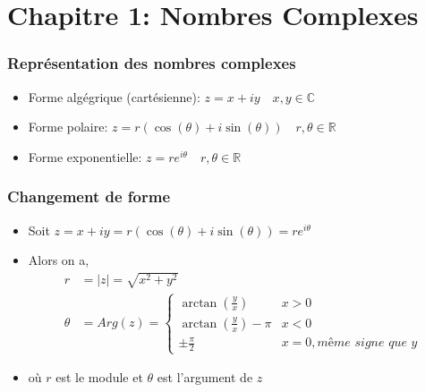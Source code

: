 \section*{Chapitre 1: Nombres Complexes}

\subsubsection*{Représentation des nombres complexes}
\begin{itemize}[itemsep = 0.5em]
    \item[] Forme algégrique (cartésienne): \begin{math}z = x + iy \quad x,y \in \mathbb{C} \end{math}
    \item[] Forme polaire: $z = r(\cos(\theta)+i\sin(\theta)) \quad r, \theta \in \mathbb{R}$
    \item[] Forme exponentielle: \(z = re^{i\theta} \quad r, \theta \in \mathbb{R} \)
  \end{itemize}


\subsubsection*{Changement de forme}
\begin{itemize}
    \item[] Soit $z = x + iy = r(\cos(\theta)+i\sin(\theta)) = re^{i\theta}$
    \item[] Alors on a,
    \begin{align*}
    r &= |z| = \sqrt{x^2 + y^2} \\
    \theta &= Arg(z) =
    \begin{cases} 
        \arctan(\frac{y}{x}) & x > 0 \\
        \arctan(\frac{y}{x}) - \pi & x < 0 \\
        \pm\frac{\pi}{2} & x = 0, \textit{même signe que y}
    \end{cases}
    \end{align*}
    \item[] où $r$ est le module et $\theta$ est l'argument de $z$ 
\end{itemize}


